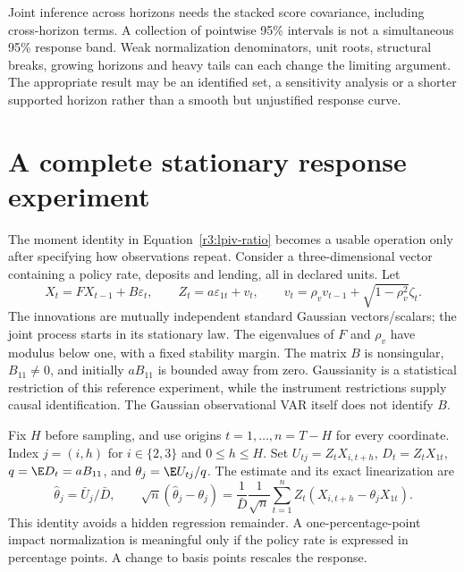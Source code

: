 Joint inference across horizons needs the stacked score covariance,
including cross-horizon terms. A collection of pointwise 95\% intervals
is not a simultaneous 95\% response band. Weak normalization denominators,
unit roots, structural breaks, growing horizons and heavy tails can
each change the limiting argument. The appropriate result may be an
identified set, a sensitivity analysis or a shorter supported horizon
rather than a smooth but unjustified response curve.



\section{A complete stationary response experiment}
\label{s4:response-construction}
The moment identity in Equation~\eqref{r3:lpiv-ratio} becomes a usable
operation only after specifying how observations repeat. Consider a
three-dimensional vector containing a policy rate, deposits and lending,
all in declared units. Let
\[
 X_t=FX_{t-1}+B\varepsilon_t,\qquad
 Z_t=a\varepsilon_{1t}+v_t,\qquad
 v_t=\rho_vv_{t-1}+\sqrt{1-\rho_v^2}\zeta_t.
\]
The innovations are mutually independent standard Gaussian vectors/scalars;
the joint process starts in its stationary law. The eigenvalues of $F$ and
$\rho_v$ have modulus below one, with a fixed stability margin. The matrix
$B$ is nonsingular, $B_{11}\ne0$, and initially $aB_{11}$ is bounded away
from zero. Gaussianity is a statistical restriction of this reference
experiment, while the instrument restrictions supply causal identification.
The Gaussian observational VAR itself does not identify $B$.

Fix $H$ before sampling, and use origins $t=1,\ldots,n=T-H$ for every
coordinate. Index $j=(i,h)$ for $i\in\{2,3\}$ and $0\le h\le H$.
Set $U_{tj}=Z_tX_{i,t+h}$, $D_t=Z_tX_{1t}$,
$q=\E D_t=aB_{11}$, and $\theta_j=\E U_{tj}/q$.
The estimate and its exact linearization are
\begin{equation}
 \widehat\theta_j=\bar U_j/\bar D,\qquad
 \sqrt n(\widehat\theta_j-\theta_j)
 =\frac{1}{\bar D}\frac1{\sqrt n}\sum_{t=1}^n
       Z_t(X_{i,t+h}-\theta_jX_{1t}).
 \label{s4:ratio-linearization}
\end{equation}
This identity avoids a hidden regression remainder. A one-percentage-point
impact normalization is meaningful only if the policy rate is expressed
in percentage points. A change to basis points rescales the response.

